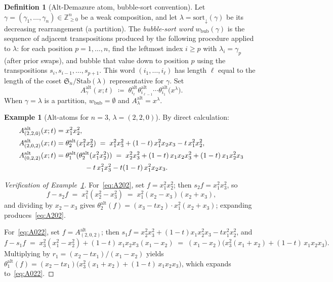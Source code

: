 \documentclass[11pt]{article}
\theoremstyle{definition}
\newtheorem{definition}[theorem]{Definition}
\newtheorem{example}[theorem]{Example}
\newcommand{\Aalt}{A^{\mathrm{alt}}}
\newcommand{\theal}{\theta^{\mathrm{alt}}}
\newcommand{\Sn}{\mathfrak{S}_n}
\newcommand{\ZZ}{\mathbb{Z}}
\begin{document}
\begin{definition}[Alt-Demazure atom, bubble-sort convention]
\label{def:atom}
Let $\gamma=(\gamma_1,\dots,\gamma_n)\in\ZZ_{\ge 0}^{n}$ be a weak composition, and let
$\lambda=\mathrm{sort}_{\downarrow}(\gamma)$ be its decreasing rearrangement (a partition).
The \emph{bubble-sort word} $w_{\mathrm{bub}}(\gamma)$ is the sequence of adjacent
transpositions produced by the following procedure applied to $\lambda$: for each
position $p=1,\dots,n$, find the leftmost index $i\ge p$ with $\lambda_i=\gamma_p$ (after
prior swaps), and bubble that value down to position $p$ using the transpositions
$s_i, s_{i-1}, \dots, s_{p+1}$. This word $(i_1,\dots,i_\ell)$ has length $\ell$ equal to
the length of the coset $\Sn/\mathrm{Stab}(\lambda)$ representative for $\gamma$. Set
\begin{equation}\label{eq:atom_def}
   \Aalt_\gamma(x;t) \;\coloneqq\; \theal_{i_\ell}\theal_{i_{\ell-1}}\cdots\theal_{i_1}\bigl(x^\lambda\bigr).
\end{equation}
When $\gamma=\lambda$ is a partition, $w_{\mathrm{bub}}=\emptyset$ and $\Aalt_\lambda = x^\lambda$.
\end{definition}

\begin{example}[Alt-atoms for $n=3$, $\lambda=(2,2,0)$]
\label{ex:atoms_220}
By direct calculation:
\begin{align}
\Aalt_{(2,2,0)}(x;t) &= x_1^2 x_2^2, \label{eq:A220}\\
\Aalt_{(2,0,2)}(x;t) &= \theal_2(x_1^2 x_2^2) \;=\; x_1^2 x_3^2 + (1-t)\,x_1^2 x_2 x_3 - t\,x_1^2 x_2^2, \label{eq:A202}\\
\Aalt_{(0,2,2)}(x;t) &= \theal_1(\theal_2(x_1^2 x_2^2))\;=\; x_2^2 x_3^2 + (1-t)\,x_1 x_2 x_3^2 + (1-t)\,x_1 x_2^2 x_3 \notag\\
                     &\qquad\qquad{}- t\,x_1^2 x_3^2 - t(1-t)\,x_1^2 x_2 x_3. \label{eq:A022}
\end{align}
\end{example}

\begin{proof}[Verification of Example~\ref{ex:atoms_220}]
For~\eqref{eq:A202}, set $f=x_1^2x_2^2$; then $s_2 f = x_1^2 x_3^2$, so
\[
 f - s_2 f \;=\; x_1^2(x_2^2 - x_3^2) \;=\; x_1^2(x_2-x_3)(x_2+x_3),
\]
and dividing by $x_2-x_3$ gives
$\theal_2(f)=(x_3-t x_2)\cdot x_1^2(x_2+x_3)$; expanding produces~\eqref{eq:A202}.

For~\eqref{eq:A022}, set $f=\Aalt_{(2,0,2)}$; then $s_1 f = x_2^2 x_3^2 + (1-t)x_1 x_2^2 x_3 - t x_1^2 x_2^2$, and
\[
 f - s_1 f \;=\; x_3^2(x_1^2-x_2^2) + (1-t)\,x_1 x_2 x_3(x_1-x_2)
            \;=\; (x_1-x_2)\bigl(x_3^2(x_1+x_2) + (1-t)\,x_1 x_2 x_3\bigr).
\]
Multiplying by $r_1=(x_2-t x_1)/(x_1-x_2)$ yields
$\theal_1(f) = (x_2 - t x_1)\bigl(x_3^2(x_1+x_2) + (1-t)\,x_1 x_2 x_3\bigr)$, which
expands to~\eqref{eq:A022}. \qedhere
\end{proof}
\end{document}
